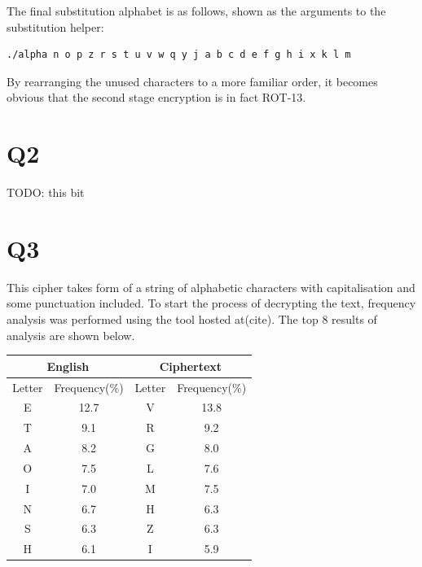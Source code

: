 \documentclass[pdflatex, a4paper,12pt]{article}
\begin{document}
\begin{quote}
    
\end{quote}

The final substitution alphabet is as follows, shown as the arguments to the
substitution helper:

\begin{verbatim}
./alpha n o p z r s t u v w q y j a b c d e f g h i x k l m
\end{verbatim}
By rearranging the unused characters to a more familiar order, it becomes
obvious that the second stage encryption is in fact ROT-13.

\section{Q2}

TODO: this bit

\section{Q3}

This cipher takes form of a string of alphabetic characters with capitalisation
and some punctuation included. To start the process of decrypting the text, frequency
analysis was performed using the tool hosted at(cite). The top 8 results of
analysis are shown below.

\begin{center}
\begin{tabular}{cc|cc}
    \multicolumn{2}{c|}{English} & \multicolumn{2}{c}{Ciphertext} \\
    \hline
    Letter & Frequency(\%) & Letter & Frequency(\%) \\
    \hline
    E                & 12.7         & V      & 13.8  \\
    T                & 9.1          & R      & 9.2   \\
    A                & 8.2          & G      & 8.0   \\
    O                & 7.5          & L      & 7.6   \\
    I                & 7.0          & M      & 7.5   \\
    N                & 6.7          & H      & 6.3   \\
    S                & 6.3          & Z      & 6.3   \\
    H                & 6.1          & I      & 5.9   \\
\end{tabular}
\end{center}
\end{document}
